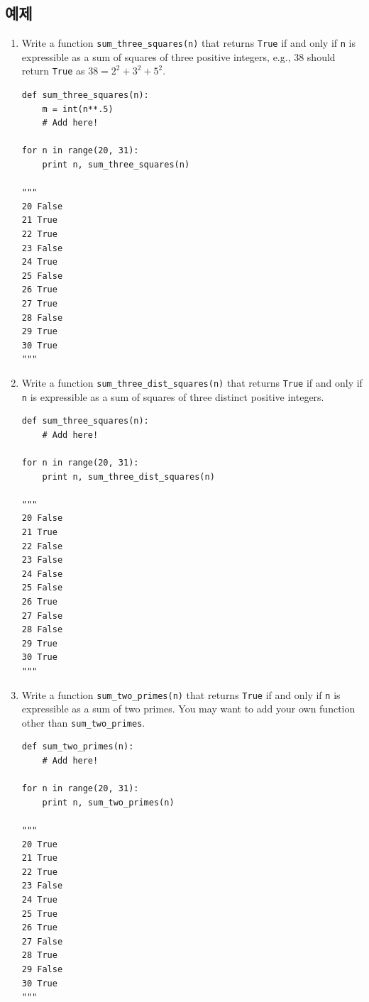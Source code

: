\documentclass[../main.tex]{subfiles}
\begin{document}
\subsection{예제}
\begin{enumerate}
\item Write a function \texttt{sum\_three\_squares(n)} that returns \texttt{True} if and only if \texttt{n} is expressible as a sum of squares of three positive integers, e.g., 38 should return \texttt{True} as $38 = 2^2 + 3^2 + 5^2$.
\begin{verbatim}
def sum_three_squares(n):
	m = int(n**.5)
	# Add here!
	
for n in range(20, 31):
	print n, sum_three_squares(n)

"""
20 False
21 True
22 True
23 False
24 True
25 False
26 True
27 True
28 False
29 True
30 True
"""
\end{verbatim}

\item Write a function \texttt{sum\_three\_dist\_squares(n)} that returns \texttt{True} if and only if \texttt{n} is expressible as a sum of squares of three distinct positive integers.
\begin{verbatim}
def sum_three_squares(n):
	# Add here!
	
for n in range(20, 31):
	print n, sum_three_dist_squares(n)

"""
20 False
21 True
22 False
23 False
24 False
25 False
26 True
27 False
28 False
29 True
30 True
"""
\end{verbatim}

\item Write a function \texttt{sum\_two\_primes(n)} that returns \texttt{True} if and only if \texttt{n} is expressible as a sum of two primes.
You may want to add your own function other than \texttt{sum\_two\_primes}.
\begin{verbatim}
def sum_two_primes(n):
	# Add here!
	
for n in range(20, 31):
	print n, sum_two_primes(n)

"""
20 True
21 True
22 True
23 False
24 True
25 True
26 True
27 False
28 True
29 False
30 True
"""
\end{verbatim}


\end{enumerate}
\end{document}

